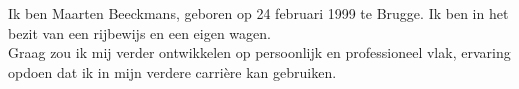 \documentclass[9pt]{developercv} %
\begin{document}


\begin{minipage}[t]{0.4\textwidth} %
	\vspace{-\baselineskip} %
	
	Ik ben Maarten Beeckmans, geboren op 24 februari 1999 te Brugge. Ik ben in het bezit van een rijbewijs en een eigen wagen.\\
	Graag zou ik mij verder ontwikkelen op persoonlijk en professioneel vlak, ervaring opdoen dat ik in mijn verdere carri\`ere kan gebruiken.
\end{minipage}
\hfill %
\begin{minipage}[t]{0.5\textwidth} %
	\vspace{-\baselineskip} %
	\begin{barchart}{5.5}
	\end{barchart}
\end{minipage}


\end{document}
